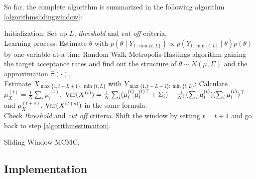 So far, the complete algorithm is summarized in the following algorithm \ref{algorithmslidingwindow}: 

\begin{algorithm}[h]
\SetAlgoLined 
Initialization: Set up $L$, \textit{threshold} and  \textit{cut off} criteria. \\
Learning process: Estimate $\theta$ with $p(\theta\mid Y_{1:\min \{t,L\} } ) \propto p(Y_{1:\min \{t,L\} } \mid \theta )p(\theta )$ by one-variable-at-a-time Random Walk Metropolis-Hastings algorithm gaining the target acceptance rates and find out the structure of $\theta\sim N(\mu,\Sigma)$ and the approximation $\hat{\pi}(\cdot)$. \label{algorithmlearningsurface}\\
Estimate $X_{ \max\{1,t-L+1 \} :\min \{t,L\} }$ with $Y_{ \max\{1,t-L+1 \} :\min \{t,L\} }$: 
Calculate $\mu_X^{(t)} = \frac{1}{N} \sum_i \mu_i^{(t)}$, $\mathrm{Var}(X^{(t)}) = \frac{1}{N} \sum_i (\mu_i^{(t)} \mu_i^{(t)\top} +\Sigma_i) -\frac{1}{N^2} (\sum_i  \mu_i^{(t)}) (\sum_i \mu_i^{(t)})^\top$ and $\mu_X^{(t+s)}$, $\mathrm{Var}(X^{(t+s)})$ in the same formula.  \\
Check \textit{threshold} and  \textit{cut off} criteria. 
Shift the window by setting $t = t+1$ and go back to step \ref{algorithmestimaiton}.
 \caption{Sliding Window MCMC.}\label{algorithmslidingwindow}
\end{algorithm}



\subsection{Implementation}

